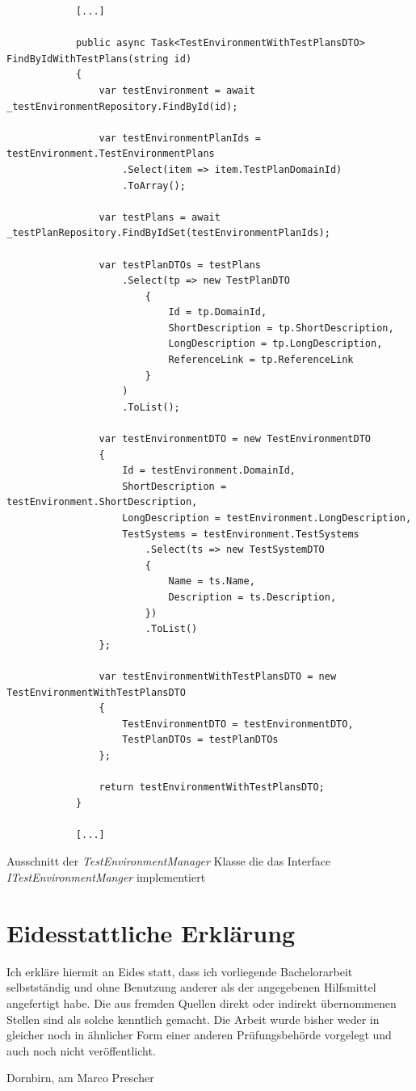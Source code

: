 \documentclass[a4paper, fontsize=11pt, parskip=half, twoside]{scrreprt}
\begin{document}
	\begin{listing}[ht]
		\begin{verbatim}
			[...]
			
			public async Task<TestEnvironmentWithTestPlansDTO> FindByIdWithTestPlans(string id)
			{
				var testEnvironment = await _testEnvironmentRepository.FindById(id);
				
				var testEnvironmentPlanIds = testEnvironment.TestEnvironmentPlans
					.Select(item => item.TestPlanDomainId)
					.ToArray();
				
				var testPlans = await _testPlanRepository.FindByIdSet(testEnvironmentPlanIds);
				
				var testPlanDTOs = testPlans
					.Select(tp => new TestPlanDTO
						{
							Id = tp.DomainId,
							ShortDescription = tp.ShortDescription,
							LongDescription = tp.LongDescription,
							ReferenceLink = tp.ReferenceLink
						}
					)
					.ToList();
				
				var testEnvironmentDTO = new TestEnvironmentDTO
				{
					Id = testEnvironment.DomainId,
					ShortDescription = testEnvironment.ShortDescription,
					LongDescription = testEnvironment.LongDescription,
					TestSystems = testEnvironment.TestSystems
						.Select(ts => new TestSystemDTO
						{
							Name = ts.Name,
							Description = ts.Description,
						})
						.ToList()
				};
				
				var testEnvironmentWithTestPlansDTO = new TestEnvironmentWithTestPlansDTO
				{
					TestEnvironmentDTO = testEnvironmentDTO,
					TestPlanDTOs = testPlanDTOs
				};
				
				return testEnvironmentWithTestPlansDTO;
			}
		
			[...]
		\end{verbatim}
		\caption{Ausschnitt der \emph{TestEnvironmentManager} Klasse die das Interface \emph{ITestEnvironmentManger} implementiert}
		\label{lst:testEnvironmentManagerClass}
	\end{listing}
		
	\clearpage
	\section*{Eidesstattliche Erklärung}
	Ich erkläre hiermit an Eides statt, dass ich vorliegende Bachelorarbeit selbstständig und ohne Benutzung anderer als der angegebenen Hilfsmittel angefertigt habe. 
	Die aus fremden Quellen direkt oder indirekt übernommenen Stellen sind als solche kenntlich gemacht. 
	Die Arbeit wurde bisher weder in gleicher noch in ähnlicher Form einer anderen Prüfungsbehörde vorgelegt und auch noch nicht veröffentlicht.
	
	\vspace{3cm}
	\noindent
	Dornbirn, am  \hfill Marco Prescher
	
	
\end{document}

